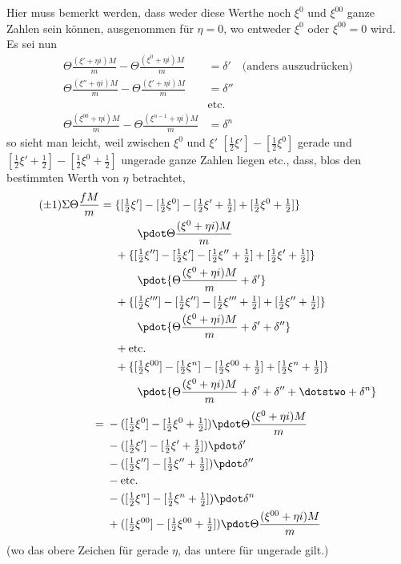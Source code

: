 Hier muss bemerkt werden, dass weder diese Werthe noch $\xi^0$ und $\xi^{00}$ ganze Zahlen sein können, ausgenommen für $\eta=0$, wo entweder $\xi^0$ oder $\xi^{00}=0$ wird. Es sei nun
\[
\begin{aligned}
\Theta\frac{(\xi'+\eta i)M}{m}-\Theta\frac{(\xi^0+\eta i)M}{m}&=\delta'\quad\text{(anders auszudrücken)}\\
\Theta\frac{(\xi''+\eta i)M}{m}-\Theta\frac{(\xi'+\eta i)M}{m}&=\delta''\\
&\text{etc.}\\
\Theta\frac{(\xi^{00}+\eta i)M}{m}-\Theta\frac{(\xi^{n-1}+\eta i)M}{m}&=\delta^n
\end{aligned}
\]
so sieht man leicht, weil zwischen $\xi^0$ und $\xi'$ $[\frac12\xi']-[\frac12\xi^0]$ gerade und $[\frac12\xi'+\frac12]-[\frac12\xi^0+\frac12]$ ungerade ganze Zahlen liegen etc., dass, blos den bestimmten Werth von $\eta$ betrachtet,
\[
\begin{aligned}
(\pm1)\Sigma\Theta\frac{fM}{m}
={}&\{[\tfrac12\xi']-[\tfrac12\xi^0]-[\tfrac12\xi'+\tfrac12]+[\tfrac12\xi^0+\tfrac12]\}\\
&\qquad\pdot\Theta\frac{(\xi^0+\eta i)M}{m}\\
&+\{[\tfrac12\xi'']-[\tfrac12\xi']-[\tfrac12\xi''+\tfrac12]+[\tfrac12\xi'+\tfrac12]\}\\
&\qquad\pdot\{\Theta\frac{(\xi^0+\eta i)M}{m}+\delta'\}\\
&+\{[\tfrac12\xi''']-[\tfrac12\xi'']-[\tfrac12\xi'''+\tfrac12]+[\tfrac12\xi''+\tfrac12]\}\\
&\qquad\pdot\{\Theta\frac{(\xi^0+\eta i)M}{m}+\delta'+\delta''\}\\
&+\text{etc.}\\
&+\{[\tfrac12\xi^{00}]-[\tfrac12\xi^n]-[\tfrac12\xi^{00}+\tfrac12]+[\tfrac12\xi^n+\tfrac12]\}\\
&\qquad\pdot\{\Theta\frac{(\xi^0+\eta i)M}{m}+\delta'+\delta''+\dotstwo+\delta^n\}
\end{aligned}
\]
\[
\begin{aligned}
={}&-([\tfrac12\xi^0]-[\tfrac12\xi^0+\tfrac12])\pdot\Theta\frac{(\xi^0+\eta i)M}{m}\\
&-([\tfrac12\xi']-[\tfrac12\xi'+\tfrac12])\pdot\delta'\\
&-([\tfrac12\xi'']-[\tfrac12\xi''+\tfrac12])\pdot\delta''\\
&-\text{etc.}\\
&-([\tfrac12\xi^n]-[\tfrac12\xi^n+\tfrac12])\pdot\delta^n\\
&+([\tfrac12\xi^{00}]-[\tfrac12\xi^{00}+\tfrac12])\pdot\Theta\frac{(\xi^{00}+\eta i)M}{m}
\end{aligned}
\]
(wo das obere Zeichen für gerade $\eta$, das untere für ungerade gilt.)

